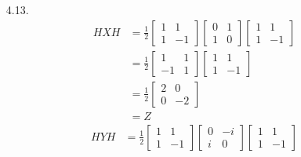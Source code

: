 \documentclass[a4paper,12pt]{article}
\begin{document}
\begin{enumerate}
    \item[4.13.]
        \begin{align*}
            HXH &= \frac{1}{2}
            \left[ \begin{array}{cc}
                1 & 1 \\
                1 & -1
            \end{array} \right]
            \left[ \begin{array}{cc}
                0 & 1 \\
                1 & 0
            \end{array} \right]
            \left[ \begin{array}{cc}
                1 & 1 \\
                1 & -1
            \end{array} \right] \\
            &= \frac{1}{2}
            \left[ \begin{array}{cc}
                1 & 1 \\
                -1 & 1
            \end{array} \right]
            \left[ \begin{array}{cc}
                1 & 1 \\
                1 & -1
            \end{array} \right] \\
            &= \frac{1}{2}
            \left[ \begin{array}{cc}
                2 & 0 \\
                0 & -2
            \end{array} \right] \\
            &= Z
        \end{align*}
        \begin{align*}
            HYH &= \frac{1}{2}
            \left[ \begin{array}{cc}
                1 & 1 \\
                1 & -1
            \end{array} \right]
            \left[ \begin{array}{cc}
                0 & -i \\
                i & 0
            \end{array} \right]
            \left[ \begin{array}{cc}
                1 & 1 \\
                1 & -1
            \end{array} \right] \\

\end{align*}
\end{enumerate}
\end{document}
